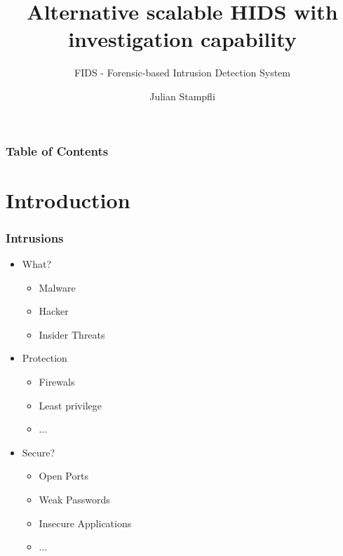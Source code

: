 \documentclass{beamer}
\begin{document}
\title{Alternative scalable HIDS with investigation capability}
\subtitle{FIDS - Forensic-based Intrusion Detection System}
\author{Julian Stampfli}

\frame{\titlepage}


\begin{frame}
  \frametitle{Table of Contents}
  \tableofcontents
\end{frame}

\section{Introduction}

\begin{frame}[fragile]
  \frametitle{Intrusions}
  \begin{itemize}
    \item What?
    \begin{itemize}
      \item Malware
      \item Hacker
      \item Insider Threats
    \end{itemize}
    \pause
    \item Protection 
    \begin{itemize}
      \item Firewals
      \item Least privilege
      \item ...
    \end{itemize}

    \item Secure\pause ?
    \begin{itemize}
      \item Open Ports
      \item Weak Passwords
      \item Insecure Applications
      \item ...
    \end{itemize}
  \end{itemize}
\end{frame}
\end{document}
